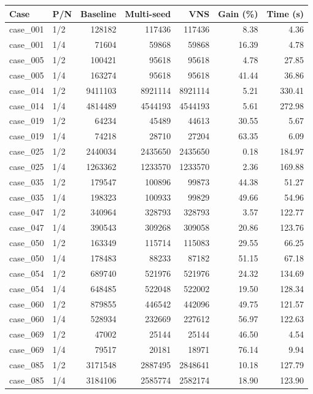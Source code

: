 \begin{tabular}{llrrrrr}
\toprule
Case & P/N & Baseline & Multi-seed & VNS & Gain (\%) & Time (s) \\
\midrule
case\_001 & 1/2 & 128182 & 117436 & 117436 & 8.38 & 4.36 \\
case\_001 & 1/4 & 71604 & 59868 & 59868 & 16.39 & 4.78 \\
case\_005 & 1/2 & 100421 & 95618 & 95618 & 4.78 & 27.85 \\
case\_005 & 1/4 & 163274 & 95618 & 95618 & 41.44 & 36.86 \\
case\_014 & 1/2 & 9411103 & 8921114 & 8921114 & 5.21 & 330.41 \\
case\_014 & 1/4 & 4814489 & 4544193 & 4544193 & 5.61 & 272.98 \\
case\_019 & 1/2 & 64234 & 45489 & 44613 & 30.55 & 5.67 \\
case\_019 & 1/4 & 74218 & 28710 & 27204 & 63.35 & 6.09 \\
case\_025 & 1/2 & 2440034 & 2435650 & 2435650 & 0.18 & 184.97 \\
case\_025 & 1/4 & 1263362 & 1233570 & 1233570 & 2.36 & 169.88 \\
case\_035 & 1/2 & 179547 & 100896 & 99873 & 44.38 & 51.27 \\
case\_035 & 1/4 & 198323 & 100933 & 99829 & 49.66 & 54.96 \\
case\_047 & 1/2 & 340964 & 328793 & 328793 & 3.57 & 122.77 \\
case\_047 & 1/4 & 390543 & 309268 & 309058 & 20.86 & 123.76 \\
case\_050 & 1/2 & 163349 & 115714 & 115083 & 29.55 & 66.25 \\
case\_050 & 1/4 & 178483 & 88233 & 87182 & 51.15 & 67.18 \\
case\_054 & 1/2 & 689740 & 521976 & 521976 & 24.32 & 134.69 \\
case\_054 & 1/4 & 648485 & 522048 & 522002 & 19.50 & 128.34 \\
case\_060 & 1/2 & 879855 & 446542 & 442096 & 49.75 & 121.57 \\
case\_060 & 1/4 & 528934 & 232669 & 227612 & 56.97 & 122.63 \\
case\_069 & 1/2 & 47002 & 25144 & 25144 & 46.50 & 4.54 \\
case\_069 & 1/4 & 79517 & 20181 & 18971 & 76.14 & 9.94 \\
case\_085 & 1/2 & 3171548 & 2887495 & 2848641 & 10.18 & 127.79 \\
case\_085 & 1/4 & 3184106 & 2585774 & 2582174 & 18.90 & 123.90 \\

\end{tabular}
